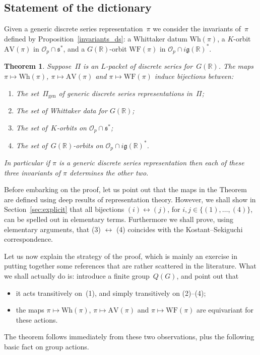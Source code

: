 \documentclass[cupthm]{CUP-JNL-JMJ}
\numberwithin{equation}{section}
\theoremstyle{cupplain}
\newtheorem{theorem}{Theorem}[section]
\theoremstyle{cupdefinition}
\theoremstyle{cupremark}
\theoremstyle{cupproof}
\newcommand{\R}{\mathbb R}
\newcommand{\g}{\mathfrak g}
\newcommand{\s}{\mathfrak s}
\newcommand{\AV}{\mathrm{AV}}
\newcommand{\Wh}{\mathrm{Wh}}
\newcommand{\WF}{\mathrm{WF}}
\begin{document}
\subsection{Statement of the dictionary}  



Given a generic discrete series representation~$\pi$ we consider the invariants of~$\pi$ defined by Proposition~\ref{invariants_ds}: a Whittaker datum  $\Wh(\pi)$, a $K$-orbit $\AV(\pi)$ in $\mathcal{O}_p \cap \s^*$, and a $G(\R)$-orbit $\WF(\pi)$ in $\mathcal{O}_p \cap  i \g(\R)^*$.


\begin{theorem} \label{th:main} Suppose~$\Pi$ is an $L$-packet of discrete series for~$G(\R)$. 
The maps $\pi \mapsto \Wh(\pi)$, $\pi \mapsto \AV(\pi)$ and $\pi\mapsto \WF(\pi)$ induce bijections between\textup{:}
\begin{enumerate}
\item[(1)] The set~$\Pi_{\mathrm{gen}}$ of generic discrete series representations in~$\Pi$\textup{;}
\item[(2)] The set of Whittaker data for $G(\R)$\textup{;}
\item[(3)] The set of~$K$-orbits on $\mathcal{O}_p \cap \s^*$\textup{;}
\item[(4)] The set of~$G(\R)$-orbits on $\mathcal{O}_p \cap  i \g(\R)^*$\textup{.}
\end{enumerate}
In particular if $\pi$ is a generic discrete series representation then each of these three invariants of $\pi$ determines the other two. 
\end{theorem}

Before embarking on the proof, let us point out that the maps in the
Theorem are defined using deep results of representation
theory. However, we shall show in Section~\ref{sec:explicit} that all
bijections $(i) \leftrightarrow (j)$, for $i,j \in \{(1), \dots,
(4)\}$, can be spelled out in elementary terms. Furthermore we shall
prove, using elementary arguments, that (3) $\leftrightarrow$ (4)
coincides with the Kostant--Sekiguchi correspondence.



Let us now explain the strategy of the proof, which is mainly an exercise in putting together some references that are rather scattered in the literature. What we shall actually do is: introduce a finite group~$Q(G)$, and point out that 
\begin{itemize}
\item[(i)] it acts transitively on~(1), and simply transitively on (2)--(4);
\item[(ii)] the maps $\pi \mapsto \Wh(\pi)$, $\pi \mapsto \AV(\pi)$ and $\pi\mapsto \WF(\pi)$  are equivariant for these actions.
\end{itemize}
The theorem follows immediately from these two observations, plus the following basic fact on group actions.
\end{document}
